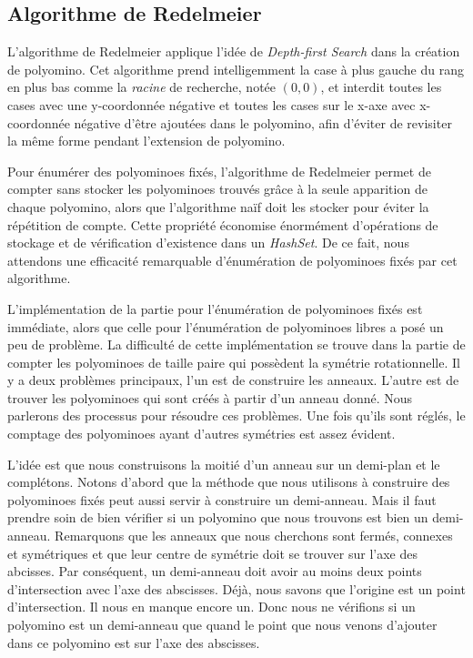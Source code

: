 \documentclass[a4paper,12pt]{article}
\begin{document}
	\subsection{Algorithme de Redelmeier}
	\par L'algorithme de Redelmeier\cite{redelmeier} applique l'idée de \textit{Depth-first Search} dans la création de polyomino. Cet algorithme prend intelligemment la case à plus gauche du rang en plus bas comme la \textit{racine} de recherche, notée $(0,0)$, et interdit toutes les cases avec une y-coordonnée négative et toutes les cases sur le x-axe avec x-coordonnée négative d'être ajoutées dans le polyomino, afin d'éviter de revisiter la même forme pendant l'extension de polyomino.
	\par Pour énumérer des polyominoes fixés, l'algorithme de Redelmeier permet de compter sans stocker les polyominoes trouvés grâce à la seule apparition de chaque polyomino, alors que l'algorithme naïf doit les stocker pour éviter la répétition de compte. Cette propriété économise énormément d'opérations de stockage et de vérification d'existence dans un \textit{HashSet}. De ce fait, nous attendons une efficacité remarquable d'énumération de polyominoes fixés par cet algorithme.
	
	\par L'implémentation de la partie pour l'énumération de polyominoes fixés est immédiate, alors que celle pour l'énumération de polyominoes libres a posé un peu de problème. La difficulté de cette implémentation se trouve dans la partie de compter les polyominoes de taille paire qui possèdent la symétrie rotationnelle. Il y a deux problèmes principaux, l'un est de construire les anneaux. L'autre est de trouver les polyominoes qui sont créés à partir d'un anneau donné. Nous parlerons des processus pour résoudre ces problèmes. Une fois qu'ils sont réglés, le comptage des polyominoes ayant d'autres symétries est assez évident.
	
	\par L'idée est que nous construisons la moitié d'un anneau sur un demi-plan et le complétons. Notons d'abord que la méthode que nous utilisons à construire des polyominoes fixés peut aussi servir à construire un demi-anneau. Mais il faut prendre soin de bien vérifier si un polyomino que nous trouvons est bien un demi-anneau. Remarquons que les anneaux que nous cherchons sont fermés, connexes et symétriques et que leur centre de symétrie doit se trouver sur l'axe des abcisses. Par conséquent, un demi-anneau doit avoir au moins deux points d'intersection avec l'axe des abscisses. Déjà, nous savons que l'origine est un point d'intersection. Il nous en manque encore un. Donc nous ne vérifions si un polyomino est un demi-anneau que quand le point que nous venons d'ajouter dans ce polyomino est sur l'axe des abscisses. 
	
\end{document}
